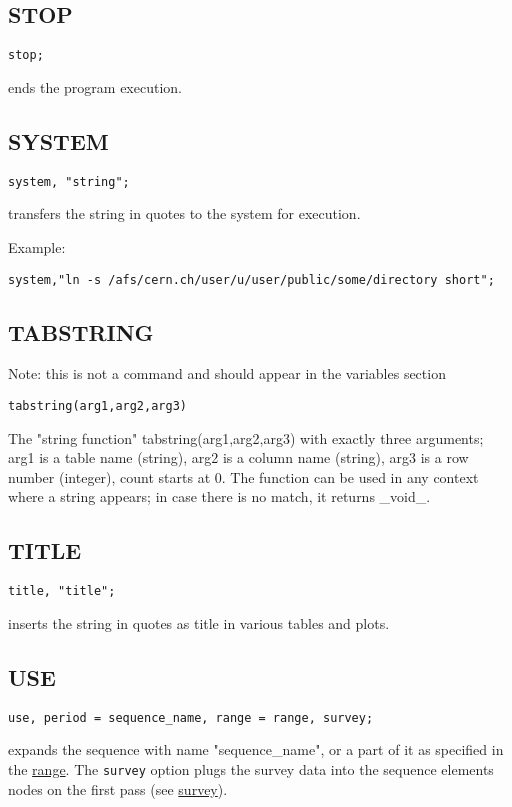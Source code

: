 \subsection{STOP}
\begin{verbatim}
stop;
\end{verbatim} 
ends the program execution. 


\subsection{SYSTEM}
\begin{verbatim}
system, "string";
\end{verbatim} 
transfers the string in quotes to the system for execution.  

Example: 
\begin{verbatim}
system,"ln -s /afs/cern.ch/user/u/user/public/some/directory short";
\end{verbatim}


\subsection{TABSTRING}
Note: this is not a command and should appear in the variables section
\begin{verbatim}
tabstring(arg1,arg2,arg3)
\end{verbatim}  
The "string function" tabstring(arg1,arg2,arg3) with exactly  three
arguments; arg1 is a table name (string), arg2 is a column name
(string), arg3 is a row number (integer), count starts at 0. The
function can be used in any context where a string appears; in case
there is no match, it returns \_void\_.  


\subsection{TITLE}
\begin{verbatim}
title, "title";
\end{verbatim} 
inserts the string in quotes as title in various tables and plots.  


\subsection{USE}
\label{subsec:general_use}
\begin{verbatim}
use, period = sequence_name, range = range, survey;
\end{verbatim} 
expands the sequence with name "sequence\_name", or a part of it as specified
in the \href{../Introduction/ranges.html#range}{range}. The
\texttt{survey} option plugs the survey data into the sequence elements
nodes on the first pass (see \href{../survey/survey.html}{survey}).  


